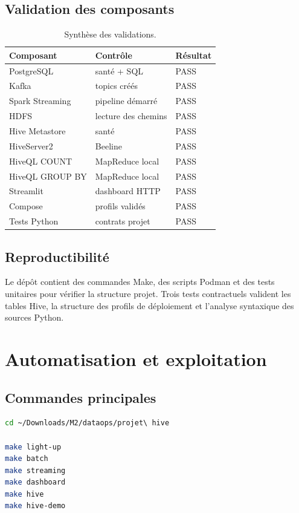 \documentclass[11pt,a4paper]{report}
\begin{document}
\section{Validation des composants}
\begin{table}[H]
\centering
\begin{tabularx}{\textwidth}{Y Y Y}
\toprule
\textbf{Composant} & \textbf{Contrôle} & \textbf{Résultat}\\
\midrule
PostgreSQL & santé + SQL & PASS\\
Kafka & topics créés & PASS\\
Spark Streaming & pipeline démarré & PASS\\
HDFS & lecture des chemins & PASS\\
Hive Metastore & santé & PASS\\
HiveServer2 & Beeline & PASS\\
HiveQL COUNT & MapReduce local & PASS\\
HiveQL GROUP BY & MapReduce local & PASS\\
Streamlit & dashboard HTTP & PASS\\
Compose & profils validés & PASS\\
Tests Python & contrats projet & PASS\\
\bottomrule
\end{tabularx}
\caption{Synthèse des validations.}
\end{table}

\section{Reproductibilité}
Le dépôt contient des commandes Make, des scripts Podman et des tests unitaires
pour vérifier la structure projet. Trois tests contractuels valident les
tables Hive, la structure des profils de déploiement et l'analyse syntaxique des sources
Python.

\chapter{Automatisation et exploitation}

\section{Commandes principales}
\begin{lstlisting}[language=bash,caption={Séquence complète de démonstration}]
cd ~/Downloads/M2/dataops/projet\ hive

make light-up
make batch
make streaming
make dashboard
make hive
make hive-demo
\end{lstlisting}
\end{document}
